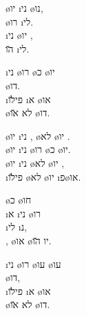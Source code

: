 
\begin{twocol}
\begin{stanza}
\o{יו} \i{ני}  \o{נו},\\
\o{רו}  \i{לי}.\\
\i{ני} \o{יו}  ,\\
 \u{הו}  \i{לי}.
\end{stanza}

\begin{stanza}
\i{ני} \o{רו} \o{כ} \o{יו}\\
 \o{דו}.\\
\i{פי}\u{לו} \i{א}  \o{או}\\
 \o{לא} \u{או} \o{דו}.
\end{stanza}

\begin{stanza}
\o{יו} \i{ני} , \o{לא} \o{יו} .\\
\o{יו} \i{ני} \o{רו} \o{כ} \o{יו}.\\
\o{יו} \i{ני}  \o{לא} \o{יו} ,\\
\i{פי}\u{לו} \o{לא} \o{יו}  \i{פ}\o{או}.
\end{stanza}

\begin{stanza}
\o{כ}  \o{חו} \\
\i{א} \i{ני} \o{רו}\\
   \i{לי}  \i{נ},\\
, \o{או} \o{יו} \u{הו}.
\end{stanza}

\begin{stanza}
\i{ני} \o{רו} \o{עו} \o{עו}\\
 \o{דו},\\
\i{פי}\u{לו} \i{א}  \o{או}\\
 \o{לא} \u{או} \o{דו}.
\end{stanza}
\end{twocol}
